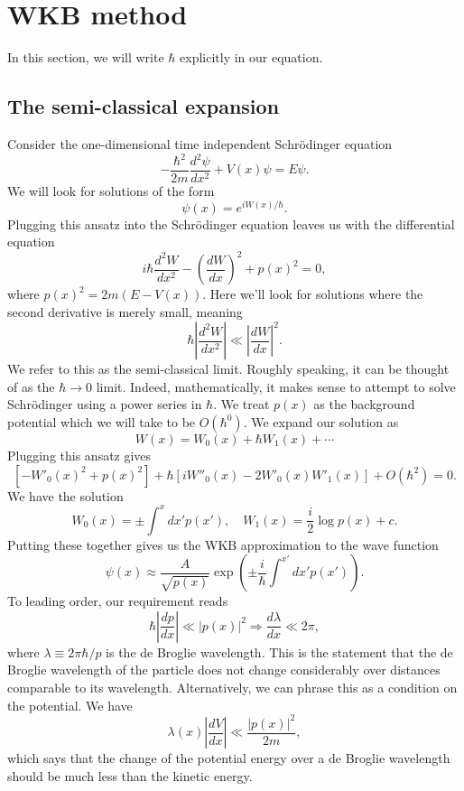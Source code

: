 \section{WKB method}
\begin{note}
In this section, we will write $\hbar$ explicitly in our equation.
\end{note}
\subsection{The semi-classical expansion}
Consider the one-dimensional time independent Schrödinger equation
\[-\frac{\hbar^2}{2m} \frac{d^2 \psi}{dx^2} + V(x)\psi = E\psi.\]
We will look for solutions of the form
\[\psi(x) = e^{iW(x)/\hbar}.\]
Plugging this ansatz into the Schr\"{o}dinger equation leaves us with the differential equation
\[i\hbar \frac{d^2W}{dx^2} - \left( \frac{dW}{dx} \right)^2 + p(x)^2 = 0,\]
where $p(x)^2 = 2m(E-V(x))$.
Here we'll look for solutions where the second derivative is merely small, meaning
\[\hbar \left| \frac{d^2W}{dx^2} \right| \ll \left| \frac{dW}{dx} \right|^2.\]
We refer to this as the semi-classical limit. Roughly speaking, it can be thought of as the $\hbar \to 0$ limit. Indeed, mathematically, it makes sense to attempt to solve Schr\"{o}dinger using a power series in $\hbar$. 
We treat $p(x)$ as the background potential which we will take to be $O(\hbar^0)$. We expand our solution as
\[W(x) = W_0(x) + \hbar W_1(x) + \cdots\]
Plugging this ansatz gives
\[\left[-W'_0(x)^2 + p(x)^2 \right] + \hbar \left[ iW''_0(x) - 2W'_0(x)W'_1(x) \right] + O(\hbar^2) = 0.\]
We have the solution
\[W_0(x) = \pm \int^x dx' p(x') , \quad W_1(x) = \frac{i}{2} \log p(x) + c.\]
Putting these together gives us the WKB approximation to the wave function
\[\psi(x) \approx \frac{A}{\sqrt{p(x)}} \exp \left( \pm \frac{i}{\hbar} \int^{x'} dx' p(x')\right).\]
To leading order, our requirement reads
\[\hbar \left| \frac{dp}{dx} \right| \ll |p(x)|^2  \Rightarrow \frac{d\lambda}{dx} \ll 2\pi,\]
where $\lambda \equiv 2\pi \hbar / p$ is the de Broglie wavelength. This is the statement that the de Broglie wavelength of the particle does not change considerably over distances comparable to its wavelength.
Alternatively, we can phrase this as a condition on the potential. We have
\[\lambda(x) \left| \frac{dV}{dx} \right| \ll \frac{|p(x)|^2}{2m},\]
which says that the change of the potential energy over a de Broglie wavelength should be much less than the kinetic energy.
\\ \\
